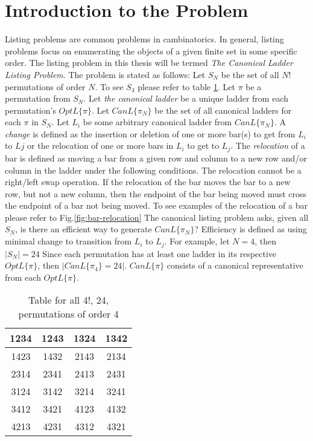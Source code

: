\section{Introduction to the Problem}
Listing problems are common problems in cambinatorics. In general, listing problems 
focus on enumerating the objects of a given finite set in some specific order. The listing problem in this thesis 
will be termed \emph{The Canonical Ladder Listing Problem}. The problem is stated as follows: Let 
$S_{N}$ be the set of all $N!$ permutations of order $N$. To see $S_{4}$ please refer to table \ref{table:aa}. 
Let $\pi$ be a permutation from $S_{N}$. 
Let \emph{the canonical ladder} be a unique ladder from each permutation's $OptL\{\pi\}$. Let $CanL\{\pi_{N}\}$ be the set of all 
canonical ladders for each $\pi$ in $S_{N}$. Let $L_{i}$ be some arbitrary canonical ladder from $CanL\{\pi_{N}\}$. A \emph{change} 
is defined as the insertion or deletion of one or more bar(s) to get from $L_{i}$ to $L{j}$ or the relocation of one or more bars 
in $L_{i}$ to get to $L_{j}$. The \emph{relocation} of a bar is defined as moving a bar from a given row and column 
to a new row and/or column in the ladder under the following conditions.
The relocation cannot be a right/left swap operation. If the relocation of the bar moves the bar to a new row, but not a new column, then the endpoint 
of the bar being moved must cross the endpoint of a bar not being moved. To see examples of the relocation of a bar please refer to Fig.\ref{fig:bar-relocation}   
The canonical listing problem asks, given all $S_{N}$, is there an efficient way to generate $CanL\{\pi_{N}\}$? Efficiency is defined as 
using minimal change to transition from $L_{i}$ to $L_{j}$. For example, let $N=4$, then $|S_{N}|=24$ 
Since each permutation has at least one ladder in its respective $OptL\{\pi\}$, then $|CanL\{\pi_{4}\}=24|$. $CanL\{\pi\}$ consists 
of a canonical representative from each $OptL\{\pi\}$. 

\begin{center}
\begin{table}[ht]
    \caption{Table for all 4!, 24, permutations of order 4} 

    \centering
       \begin{tabular}{|c |c |c |c |}
        \hline
        1234 & 1243 & 1324 & 1342 \\ \hline
        1423 & 1432 & 2143 & 2134 \\ \hline 
        2314 & 2341 & 2413 & 2431 \\ \hline 
        3124 & 3142 & 3214 & 3241 \\ \hline 
        3412 & 3421 & 4123 & 4132 \\ \hline 
        4213 & 4231 & 4312 & 4321 \\ \hline 
        
    \end{tabular}
    \label{table:aa}
 \end{table}
\end{center}



